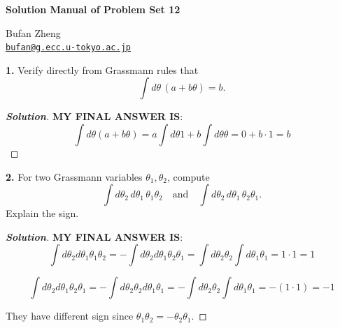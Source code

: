 \documentclass[11pt]{article}
\newenvironment{solution}[1][]{\begin{proof}[\textbf{Solution}]}{\end{proof}}
\begin{document}
\begin{center}
    {\LARGE \textbf{Solution Manual of Problem Set 12} \par}
    \vspace{1em}
    {\large Bufan Zheng\\ \href{mailto:bufan@g.ecc.u-tokyo.ac.jp}{\texttt{bufan@g.ecc.u-tokyo.ac.jp}} \par}
\end{center}




\begin{tcolorbox}[problem]
\textbf{1.} Verify directly from Grassmann rules that $$\int d\theta\,(a+b\theta)=b.$$
\end{tcolorbox}
\begin{solution}[12.1]
	\textbf{MY FINAL ANSWER IS}:
	\[
	\int d\theta (a+ b\theta)= a\int d\theta 1+b\int{d\theta}\theta =0+b\cdot 1=b
	\]
\end{solution}

\begin{tcolorbox}[problem]
\textbf{2.} For two Grassmann variables $\theta_1,\theta_2$, compute $$\int d\theta_2\,d\theta_1\,\theta_1\theta_2 \quad\text{and}\quad \int d\theta_2\,d\theta_1\,\theta_2\theta_1.$$ Explain the sign.
\end{tcolorbox}
\begin{solution}[12.2]
	\textbf{MY FINAL ANSWER IS}:
	\[
	\int{d\theta_2}d\theta_1\theta_1\theta_2=-\int d\theta_2 d\theta_1\theta_2\theta_1=\int d\theta_2\theta_2\int d\theta_1\theta_1 = 1\cdot 1=\boxed{1}
	\]
	
	\[
	\int{d\theta_2}d\theta_1\theta_2\theta_1=-\int d\theta_2\theta_2 d\theta_1\theta_1=-\int d\theta_2\theta_2\int d\theta_1\theta_1 = -\left(1\cdot 1\right)=\boxed{-1}
	\]
	
	They have different sign since $\theta_1\theta_2=-\theta_2\theta_1$.
\end{solution}
\end{document}
